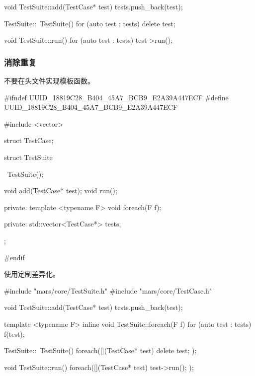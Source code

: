 \begin{content}
\begin{leftbar}
\begin{c++}[caption={\ttfamily{src/mars/core/TestSuite.cc}}]
void TestSuite::add(TestCase* test) {
  tests.push_back(test);
}

TestSuite::~TestSuite() {
  for (auto test : tests) {
    delete test;
  }
}

void TestSuite::run() {
  for (auto test : tests) {
    test->run();
  }
}
 \end{c++}
\end{leftbar}

\subsubsection{消除重复}

不要在头文件实现模板函数。

\begin{leftbar}
 \begin{c++}[caption={\ttfamily{include/mars/core/TestSuite.h}}]
#ifndef UUID_18819C28_B404_45A7_BCB9_E2A39A447ECF
#define UUID_18819C28_B404_45A7_BCB9_E2A39A447ECF

#include <vector>

struct TestCase;

struct TestSuite {
  ~TestSuite();

  void add(TestCase* test);
  void run();

private:
  template <typename F>
  void foreach(F f);

private:
  std::vector<TestCase*> tests;
};

#endif
 \end{c++}
\end{leftbar}

使用定制差异化。

\begin{leftbar}
 \begin{c++}[caption={\ttfamily{src/mars/core/TestSuite.cc}}]
#include "mars/core/TestSuite.h"
#include "mars/core/TestCase.h"

void TestSuite::add(TestCase* test) {
  tests.push_back(test);
}

template <typename F>
inline void TestSuite::foreach(F f) {
  for (auto test : tests) {
    f(test);
  }
}

TestSuite::~TestSuite() {
  foreach([](TestCase* test) {
    delete test;
  });
}

void TestSuite::run() {
  foreach([](TestCase* test) {
    test->run();
  });
}
 \end{c++}
\end{leftbar}


\end{content}
